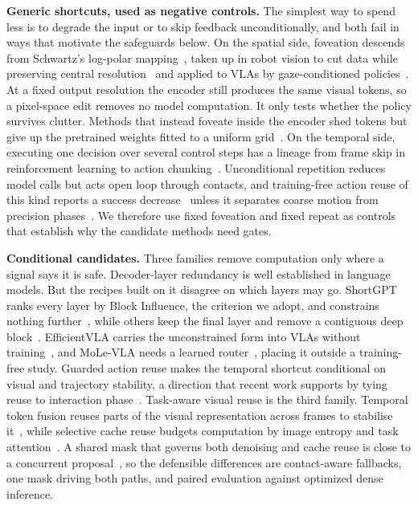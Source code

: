 \textbf{Generic shortcuts, used as negative controls.} The simplest way to
spend less is to degrade the input or to skip feedback unconditionally, and both
fail in ways that motivate the safeguards below. On the spatial side, foveation
descends from Schwartz's log-polar mapping~\cite{schwartz}, taken up in robot
vision to cut data while preserving central resolution~\cite{traver} and applied
to VLAs by gaze-conditioned policies~\cite{gazereg, lookfocusact}. At a fixed
output resolution the encoder still produces the same visual tokens, so a
pixel-space edit removes no model computation. It only tests whether the policy
survives clutter.
Methods that instead foveate inside the encoder shed tokens but give up the
pretrained weights fitted to a uniform grid~\cite{lookfocusact}. On the temporal
side, executing one decision over several control steps has a lineage from frame
skip in reinforcement learning to action chunking~\cite{dqn, act,
diffusionpolicy}. Unconditional repetition reduces model calls but acts open
loop through contacts, and training-free action reuse of this kind reports a
success decrease~\cite{flashvla} unless it separates coarse motion from
precision phases~\cite{specprune}. We therefore use fixed foveation and fixed
repeat as controls that establish why the candidate methods need gates.

\textbf{Conditional candidates.} Three families remove computation only where a
signal says it is safe. Decoder-layer redundancy is well established in language
models. But the recipes built on it disagree on which layers may go. ShortGPT
ranks every layer by Block Influence, the criterion we adopt, and constrains
nothing further~\cite{shortgpt}, while others keep the final layer and remove a
contiguous deep block~\cite{gromov}. EfficientVLA carries the unconstrained form
into VLAs without training~\cite{efficientvla}, and MoLe-VLA needs a learned
router~\cite{molevla}, placing it outside a training-free study. Guarded action
reuse makes the temporal shortcut conditional on visual and trajectory
stability, a direction that recent work supports by tying reuse to interaction
phase~\cite{flashvla, specprune}. Task-aware visual reuse is the third family.
Temporal token fusion reuses parts of the visual representation across frames to
stabilise it~\cite{ttfvla}, while selective cache reuse budgets computation by
image entropy and task attention~\cite{vlainfoentropy, vlaiap}. A shared mask
that governs both denoising and cache reuse is close to a concurrent
proposal~\cite{crossmodalreuse}, so the defensible differences are contact-aware
fallbacks, one mask driving both paths, and paired evaluation against optimized
dense inference.

